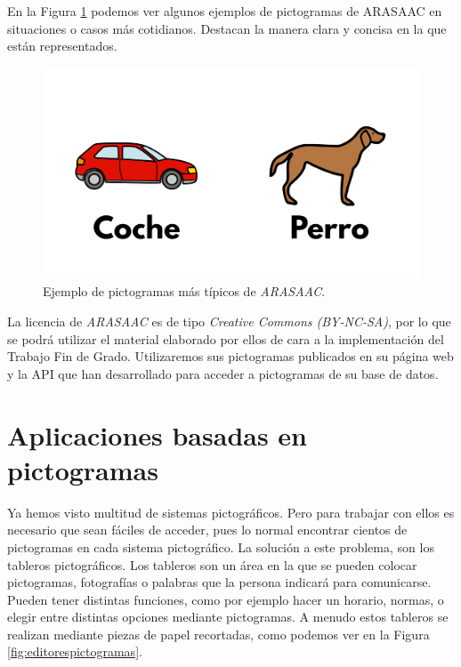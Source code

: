 En la Figura \ref{fig:arasaacpictos} podemos ver algunos ejemplos de pictogramas de ARASAAC en situaciones o casos más cotidianos. Destacan la manera clara y concisa en la que están representados. 

\begin{figure}[h!]
	\centering
	\includegraphics[width=0.7\linewidth]{Imagenes/Bitmap/ARASAACPictos}
	\caption{Ejemplo de pictogramas más típicos de \textit{ARASAAC}.}
	\label{fig:arasaacpictos}
\end{figure}

La licencia de \textit{ARASAAC} es de tipo \textit{Creative Commons (BY-NC-SA)}, por lo que se podrá utilizar el material elaborado por ellos de cara a la implementación del Trabajo Fin de Grado. Utilizaremos sus pictogramas publicados en su página web y la API que han desarrollado para acceder a pictogramas de su base de datos.

\section{Aplicaciones basadas en pictogramas}
\label{cap3:sec:editor-tableros}

Ya hemos visto multitud de sistemas pictográficos. Pero para trabajar con ellos es necesario que sean fáciles de acceder, pues lo normal encontrar cientos de pictogramas en cada sistema pictográfico. La solución a este problema, son los tableros pictográficos. Los tableros son un área en la que se pueden colocar pictogramas, fotografías o palabras que la persona indicará para comunicarse. Pueden tener distintas funciones, como por ejemplo hacer un horario, normas, o elegir entre distintas opciones mediante pictogramas. A menudo estos tableros se realizan mediante piezas de papel recortadas, como podemos ver en la Figura \ref{fig:editorespictogramas}.

